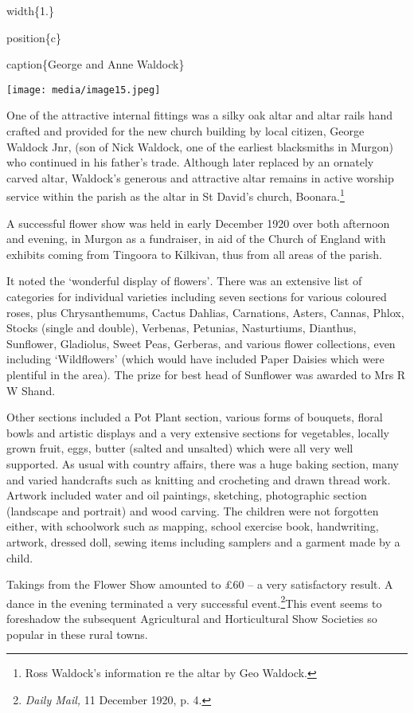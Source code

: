width\{1.\}

position\{c\}

caption\{George and Anne Waldock\}

\texttt{[image: media/image15.jpeg]}

One of the attractive internal fittings was a silky oak altar and altar rails hand crafted and provided for the new church building by local citizen, George Waldock Jnr, (son of Nick Waldock, one of the earliest blacksmiths in Murgon) who continued in his father's trade. Although later replaced by an ornately carved altar, Waldock's generous and attractive altar remains in active worship service within the parish as the altar in St David's church, Boonara.\footnote{Ross Waldock's information re the altar by Geo Waldock.}

A successful flower show was held in early December 1920 over both afternoon and evening, in Murgon as a fundraiser, in aid of the Church of England with exhibits coming from Tingoora to Kilkivan, thus from all areas of the parish.

It noted the `wonderful display of flowers'\emph{.} There was an extensive list of categories for individual varieties including seven sections for various coloured roses, plus Chrysanthemums, Cactus Dahlias, Carnations, Asters, Cannas, Phlox, Stocks (single and double), Verbenas, Petunias, Nasturtiums, Dianthus, Sunflower, Gladiolus, Sweet Peas, Gerberas, and various flower collections, even including `Wildflowers' (which would have included Paper Daisies which were plentiful in the area). The prize for best head of Sunflower was awarded to Mrs R W Shand.

Other sections included a Pot Plant section, various forms of bouquets, floral bowls and artistic displays and a very extensive sections for vegetables, locally grown fruit, eggs, butter (salted and unsalted) which were all very well supported. As usual with country affairs, there was a huge baking section, many and varied handcrafts such as knitting and crocheting and drawn thread work. Artwork included water and oil paintings, sketching, photographic section (landscape and portrait) and wood carving. The children were not forgotten either, with schoolwork such as mapping, school exercise book, handwriting, artwork, dressed doll, sewing items including samplers and a garment made by a child.

Takings from the Flower Show amounted to £60 -- a very satisfactory result. A dance in the evening terminated a very successful event.\footnote{\emph{Daily Mail,} 11 December 1920, p. 4.}This event seems to foreshadow the subsequent Agricultural and Horticultural Show Societies so popular in these rural towns.

